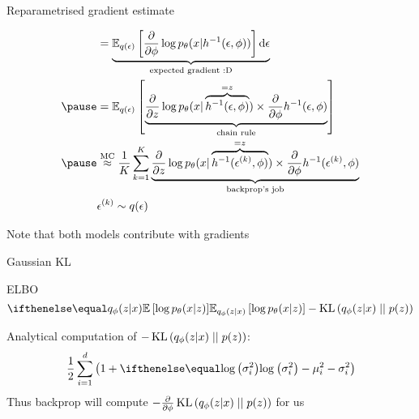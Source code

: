 \begin{frame}[plain]{Reparametrised gradient estimate}

\begin{equation*}
\begin{aligned}
&= \underbrace{\mathbb E_{q(\epsilon)}\left[ \pdv{\phi} \log p_\theta(x| h^{-1}(\epsilon,\phi))\right] \dd{\epsilon}}_{\text{expected gradient :D}} \\ \pause
&= \mathbb E_{q(\epsilon)} \left[ \underbrace{\pdv{z} \log p_\theta(x| \overbrace{h^{-1}(\epsilon,\phi)}^{=z}) \times \pdv{\phi} h^{-1}(\epsilon,\phi)}_{\text{chain rule}} \right] \\ \pause
&\overset{\text{MC}}{\approx} \frac{1}{K}\sum_{k=1}^{K} \underbrace{\pdv{z} \log p_\theta(x| \overbrace{h^{-1}(\epsilon^{(k)},\phi)}^{=z}) \times \pdv{\phi} h^{-1}(\epsilon^{(k)},\phi)}_{\text{backprop's job}}\\
&\epsilon^{(k)} \sim q(\epsilon)
\end{aligned}
\end{equation*}

Note that both models contribute with gradients

\end{frame}

\begin{frame}{Gaussian KL}
\begin{block}{ELBO}
\begin{equation*}
\E[q_\phi(z|x)]{\log p_\theta(x|z)} - \KL{q_\phi(z|x)}{p(z)}
\end{equation*}
\end{block}
\pause
Analytical computation of $ -\operatorname{KL}\left(q_\phi(z|x)\mid\mid p(z)\right) $:
\begin{equation*}
\frac{1}{2}\sum_{i=1}^{d}\left(1 + \loga{\sigma^{2}_{i}} -
\mu^{2}_{i} - \sigma^{2}_{i} \right)
\end{equation*}
\pause
Thus backprop will compute $-\pdv{\phi} \operatorname{KL}\left(q_\phi(z|x)\mid\mid p(z)\right)$ for us
\end{frame}


